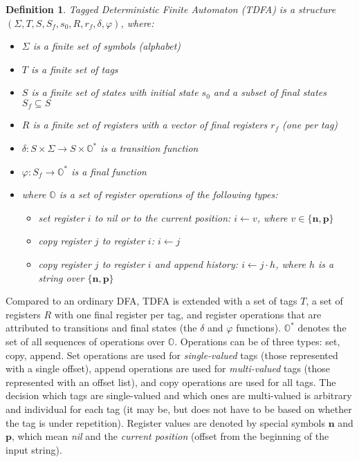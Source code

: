 \documentclass[]{article}
\newtheorem{definition}{Definition}
\newcommand{\YO}{\mathbb{O}}
\begin{document}
\begin{definition} \label{def_tnfa}
Tagged Deterministic Finite Automaton (TDFA)
is a structure $(\Sigma, T, S, S_f, s_0, R, r_{\!f}, \delta, \varphi)$, where:
\begin{itemize}
    \item[] $\Sigma$ is a finite set of symbols (alphabet)
    \item[] $T$ is a finite set of tags
    \item[] $S$ is a finite set of states with initial state $s_0$ and a subset of final states $S_f \subseteq S$
    \item[] $R$ is a finite set of registers with a vector of final registers $r_{\!f}$ (one per tag)
    \item[] $\delta : S \times \Sigma \rightarrow S \times \YO^*$ is a transition function
    \item[] $\varphi : S_f \rightarrow \YO^*$ is a final function
    \medskip
    \item[] where $\YO$ is a set of register operations of the following types:
    \begin{itemize}
        \item[] set register $i$ to nil or to the current position: $i \leftarrow v$, where $v \in \{\mathbf{n}, \mathbf{p}\}$
        \item[] copy register $j$ to register $i$: $i \leftarrow j$
        \item[] copy register $j$ to register $i$ and append history: $i \leftarrow j \cdot h$, where $h$ is a string over $\{\mathbf{n}, \mathbf{p}\}$
    \end{itemize}
\end{itemize}
\end{definition}

Compared to an ordinary DFA, TDFA is extended with a set of tags $T$,
a set of registers $R$ with one final register per tag,
and register operations that are attributed to transitions and final states (the $\delta$ and $\varphi$ functions).
$\YO^*$ denotes the set of all sequences of operations over $\YO$.
Operations can be of three types: set, copy, append.
Set operations are used for \emph{single-valued} tags (those represented with a single offset),
append operations are used for \emph{multi-valued} tags (those represented with an offset list), and
copy operations are used for all tags.
The decision which tags are single-valued and which ones are multi-valued is arbitrary and individual for each tag
(it may be, but does not have to be based on whether the tag is under repetition).
%
Register values are denoted by special symbols $\mathbf{n}$ and $\mathbf{p}$, which mean \emph{nil} and the \emph{current position} (offset from the beginning of the input string).
\medskip
\end{document}
